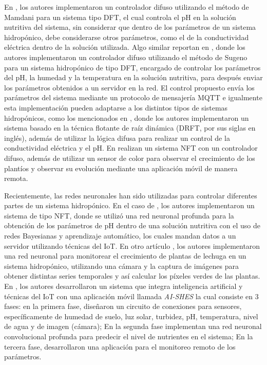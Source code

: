 En \cite{al2020kendali}, los autores implementaron un controlador difuso utilizando el método de Mamdani para un sistema tipo DFT, el cual controla el pH en la solución nutritiva del sistema, sin considerar que dentro de los parámetros de un sistema hidropónico, debe considerarse otros parámetros, como el de la conductividad eléctrica dentro de la solución utilizada. Algo similar reportan en \cite{nurhasan2018implementation}, donde los autores implementaron un controlador difuso utilizando el método de Sugeno para un sistema hidropónico de tipo DFT, encargado de controlar los parámetros del pH, la humedad y la temperatura en la solución nutritiva, para después enviar los parámetros obtenidos a un servidor en la red. El control propuesto envía los parámetros del sistema mediante un protocolo de mensajería MQTT e igualmente esta implementación pueden adaptarse a los distintos tipos de sistemas hidropónicos, como los mencionados en \cite{fuangthong2018automatic}, donde los autores implementaron un sistema basado en la técnica flotante de raíz dinámica (DRFT, por sus siglas en inglés), además de utilizar la lógica difusa para realizar un control de la conductividad eléctrica y el pH. En \cite{simanjuntak2022design} realizan un sistema NFT con un controlador difuso, además de utilizar un sensor de color para observar el crecimiento de los plantíos y observar su evolución mediante una aplicación móvil de manera remota.

Recientemente, las redes neuronales han sido utilizadas para controlar diferentes partes de un sistema hidropónico. En el caso de \cite{mehra2018iot}, los autores implementaron un sistema de tipo NFT, donde se utilizó una red neuronal profunda para la obtención de los parámetros de pH dentro de una solución nutritiva con el uso de redes Bayesianas y aprendizaje automático, los cuales mandan datos a un servidor utilizando técnicas del IoT. En otro artículo \cite{tenzer2020digital}, los autores implementaron una red neuronal para monitorear el crecimiento de plantas de lechuga en un sistema hidropónico, utilizando una cámara y la captura de imágenes para obtener distintas series temporales y así calcular los píxeles verdes de las plantas. En \cite{ramakrishnam2022design}, los autores desarrollaron un sistema que integra inteligencia artificial y técnicas del IoT con una aplicación móvil llamada \emph{AI-SHES} la cual consiste en 3 fases: en la primera fase, diseñaron un circuito de conexiones para sensores, específicamente de humedad de suelo, luz solar, turbidez, pH, temperatura, nivel de agua y de imagen (cámara); En la segunda fase implementan una red neuronal convolucional profunda para predecir el nivel de nutrientes en el sistema; En la tercera fase, desarrollaron una aplicación para el monitoreo remoto de los parámetros. 

